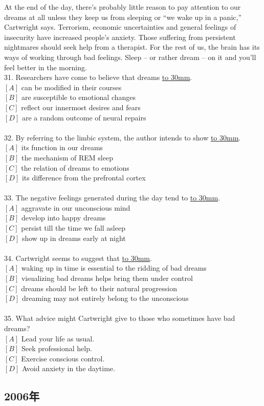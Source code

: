 \documentclass[a4paper]{article}
\begin{document}
\par
At the end of the day, there’s probably little reason to pay attention to our dreams at all unless they keep us from sleeping or “we wake up in a panic,” Cartwright says. Terrorism, economic uncertainties and general feelings of insecurity have increased people’s anxiety. Those suffering from persistent nightmares should seek help from a therapist. For the rest of us, the brain has its ways of working through bad feelings. Sleep -- or rather dream -- on it and you’ll feel better in the morning.
\\31.	Researchers have come to believe that dreams \underline{\hbox to 30mm{}}.\\$[A]$ can be modified in their courses\\$[B]$ are susceptible to emotional changes\\$[C]$ reflect our innermost desires and fears\\$[D]$ are a random outcome of neural repairs\\\\32.	By referring to the limbic system, the author intends to show \underline{\hbox to 30mm{}}.\\$[A]$ its function in our dreams\\$[B]$ the mechanism of REM sleep\\$[C]$ the relation of dreams to emotions\\$[D]$ its difference from the prefrontal cortex\\\\33.	The negative feelings generated during the day tend to \underline{\hbox to 30mm{}}.\\$[A]$ aggravate in our unconscious mind\\$[B]$ develop into happy dreams\\$[C]$ persist till the time we fall asleep\\$[D]$ show up in dreams early at night\\\\34.	Cartwright seems to suggest that \underline{\hbox to 30mm{}}.\\$[A]$ waking up in time is essential to the ridding of bad dreams\\$[B]$ visualizing bad dreams helps bring them under control\\$[C]$ dreams should be left to their natural progression\\$[D]$ dreaming may not entirely belong to the unconscious\\\\35.	What advice might Cartwright give to those who sometimes have bad dreams?\\$[A]$ Lead your life as usual.\\$[B]$ Seek professional help.\\$[C]$ Exercise conscious control.\\$[D]$ Avoid anxiety in the daytime.\\\subsection{2006年}
\end{document}
